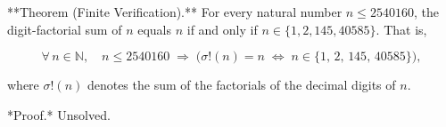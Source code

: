 
**Theorem (Finite Verification).** For every natural number $n \leq 2540160$, the digit-factorial sum of $n$ equals $n$ if and only if $n \in \{1, 2, 145, 40585\}$. That is,

$$\forall\, n \in \mathbb{N},\quad n \leq 2540160 \;\Longrightarrow\; \bigl(\sigma!(n) = n \;\iff\; n \in \{1,\,2,\,145,\,40585\}\bigr),$$

where $\sigma!(n)$ denotes the sum of the factorials of the decimal digits of $n$.

*Proof.* Unsolved.